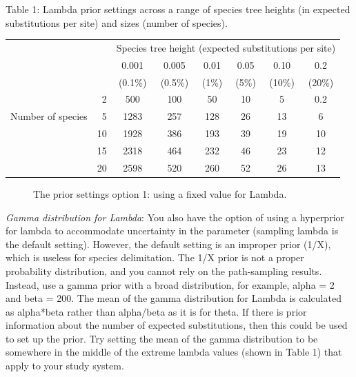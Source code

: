 {Table 1: Lambda prior settings across a range of species tree heights (in expected substitutions per site) and sizes (number of species).
\begin{table}[ht]
\tabcolsep=0.4cm
\begin{tabular}{rrcccccc}
\hline
        &    & \multicolumn{6}{c}{Species tree height (expected substitutions per site)}     \\
        				&    	& 0.001 	& 0.005 	& 0.01 	& 0.05  	& 0.10 	&0.2\\
        				&    	&  (0.1\%)	&  (0.5\%) &  (1\%) 	&  (5\%)  	& (10\%)  	& (20\%)\\ \hline
        				& 2 	& 500	& 100 	& 50 		& 10 		& 5 		& 0.2\\
Number of species 	& 5	& 1283 	& 257 	& 128 	& 26 		& 13 		& 6\\
        				& 10	& 1928 	& 386 	& 193 	& 39 		& 19 		& 10\\
        				& 15	&  2318	&  464	&  232	& 46		& 23		& 12\\
        				& 20	&  2598	&  520	&  260	& 52 		& 26 		& 13\\\hline
\end{tabular}
\end{table}
    
    \begin{figure}[htbp]
        \centering
        \caption{The prior settings option 1: using a fixed value for Lambda.}
        \label{fig:beauti-prior}
    \end{figure}   

\textit{Gamma distribution for Lambda}: You also have the option of using a hyperprior for lambda to accommodate uncertainty in the parameter (sampling lambda is the default setting). However, the default setting is an improper prior (1/X), which is useless for species delimitation. The 1/X prior is not a proper probability distribution, and you cannot rely on the path-sampling results. Instead, use a gamma prior with a broad distribution, for example, alpha = 2 and beta = 200. The mean of the gamma distribution for Lambda is calculated as alpha*beta rather than alpha/beta as it is for theta. If there is prior information about the number of expected substitutions, then this could be used to set up the prior. Try setting the mean of the gamma distribution to be somewhere in the middle of the extreme lambda values (shown in Table 1) that apply to your study system. 

}
